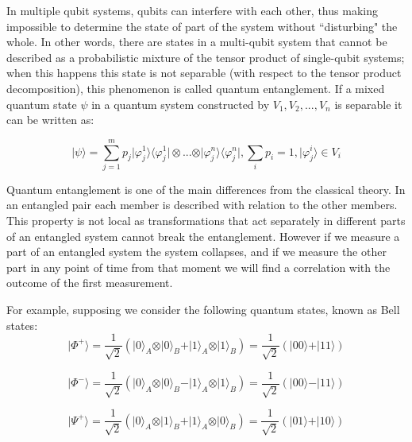 In multiple qubit systems, qubits can interfere with each other, thus making impossible to determine the state of part of the system without ``disturbing" the whole. In other words, there are states in a multi-qubit system that cannot be described as a probabilistic mixture of the tensor product of single-qubit systems; when this happens this state is not separable (with respect to the tensor product decomposition), this phenomenon is called quantum entanglement\cite{Rieffel2011}. If a mixed quantum state $\psi$ in a quantum system constructed by $V_{1}, V_{2}, ..., V_{n}$ is separable it can be written as:


\begin{equation}
\vert\psi\rangle= \sum^m_{j=1}{p_{j}\vert\varphi_{j}^{1}\rangle\langle\varphi_{j}^{1}\vert \otimes ... \otimes \vert\varphi_{j}^{n}\rangle\langle\varphi_{j}^{n}\vert}, \sum_{i}{p_{i}}=1, \vert \varphi_{j}^{i} \rangle \in V_{i}
\end{equation}

Quantum entanglement is one of the main differences from the classical theory\cite{Rieffel2011}. In an entangled pair each member is described with relation to the other members. This property is not local as transformations that act separately in different parts of an entangled system cannot break the entanglement. However if we measure a part of an entangled system  the system collapses, and if we measure the other part in any point of time from that moment we will find a correlation with the outcome of the first measurement.

For example, supposing we consider the following quantum states, known as Bell states:
\begin{equation}
\vert\Phi^{+}\rangle=\frac{1}{\sqrt{2}}(\vert0\rangle_{A} \otimes\vert0\rangle_{B} +\vert1\rangle_{A} \otimes\vert1\rangle_{B})=\frac{1}{\sqrt{2}}(\vert00\rangle+\vert11\rangle)
\end{equation}

\begin{equation}
\vert\Phi^{-}\rangle=\frac{1}{\sqrt{2}}(\vert0\rangle_{A} \otimes\vert0\rangle_{B} -\vert1\rangle_{A} \otimes\vert1\rangle_{B})=\frac{1}{\sqrt{2}}(\vert00\rangle-\vert11\rangle)
\end{equation}

\begin{equation}
\vert\Psi^{+}\rangle=\frac{1}{\sqrt{2}}(\vert0\rangle_{A} \otimes\vert1\rangle_{B} +\vert1\rangle_{A}\otimes\vert0\rangle_{B})=\frac{1}{\sqrt{2}}(\vert01\rangle+\vert10\rangle)
\end{equation}

